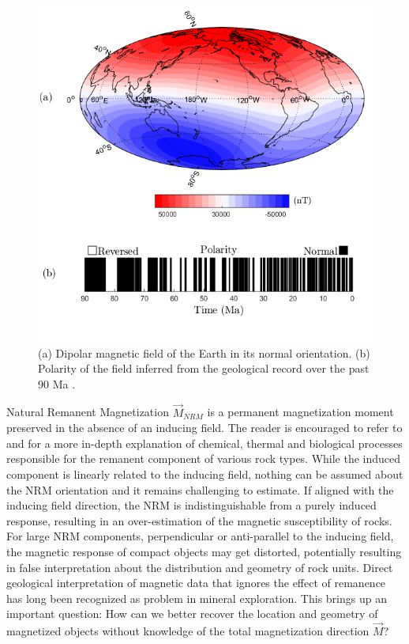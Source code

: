 \begin{figure}[h!]
\centering
\includegraphics[scale=0.6]{Earth_Field.png}
\caption{(a) Dipolar magnetic field of the Earth in its normal orientation. (b) Polarity of the field inferred from the geological record over the past 90 Ma \cite[]{Cande1995}.}
\label{fig:Earth_Field}
\end{figure}

Natural Remanent Magnetization $\vec M_{NRM}$ is a permanent magnetization moment preserved in the absence of an inducing field.
The reader is encouraged to refer to \cite{Blakely96} and \cite{Clark99} for a more in-depth explanation of chemical, thermal and biological processes responsible for the remanent component of various rock types.
While the induced component is linearly related to the inducing field, nothing can be assumed about the NRM orientation and it remains challenging to estimate.
If aligned with the inducing field direction, the NRM is indistinguishable from a purely induced response, resulting in an over-estimation of the magnetic susceptibility of rocks.
For large NRM components, perpendicular or anti-parallel to the inducing field, the magnetic response of compact objects may get distorted, potentially resulting in false interpretation about the distribution and geometry of rock units.
Direct geological interpretation of magnetic data that ignores the effect of remanence has long been recognized as problem in mineral exploration.
This brings up an important question:
How can we better recover the location and geometry of magnetized objects without knowledge of the total magnetization direction $\vec M$?

